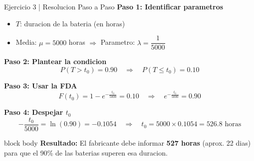 \documentclass[10pt]{beamer}
\begin{document}
\begin{frame}{Ejercicio 3 | Resolucion Paso a Paso}
\textbf{Paso 1: Identificar parametros}
\begin{itemize}
    \item $T$: duracion de la bateria (en horas)
    \item Media: $\mu = 5000$ horas $\Rightarrow$ Parametro: $\lambda = \dfrac{1}{5000}$
\end{itemize}

\vspace{0.1cm}
\textbf{Paso 2: Plantear la condicion}
\[
P(T > t_0) = 0.90 \quad \Rightarrow \quad P(T \leq t_0) = 0.10
\]

\vspace{0.1cm}
\textbf{Paso 3: Usar la FDA}
\[
F(t_0) = 1 - e^{-\frac{t_0}{5000}} = 0.10 \quad \Rightarrow \quad e^{-\frac{t_0}{5000}} = 0.90
\]

\vspace{0.1cm}
\textbf{Paso 4: Despejar $t_0$}
\[
-\frac{t_0}{5000} = \ln(0.90) = -0.1054 \quad \Rightarrow \quad t_0 = 5000 \times 0.1054 = \boxed{526.8 \text{ horas}}
\]

\vspace{0.2cm}
\begin{beamercolorbox}[rounded=true,shadow=true,wd=\linewidth]{block body}
\centering
\textbf{Resultado:} El fabricante debe informar \textbf{527 horas} (aprox. 22 dias) para que el 90\% de las baterias superen esa duracion.
\end{beamercolorbox}
\end{frame}
\end{document}
